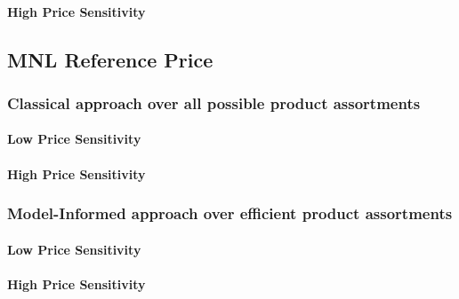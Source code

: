 

\paragraph{High Price Sensitivity}



\subsection{MNL Reference Price}

\subsubsection{Classical approach over all possible product assortments}

\paragraph{Low Price Sensitivity}



\paragraph{High Price Sensitivity}



\subsubsection{Model-Informed approach over efficient product assortments}

\paragraph{Low Price Sensitivity}



\paragraph{High Price Sensitivity}



